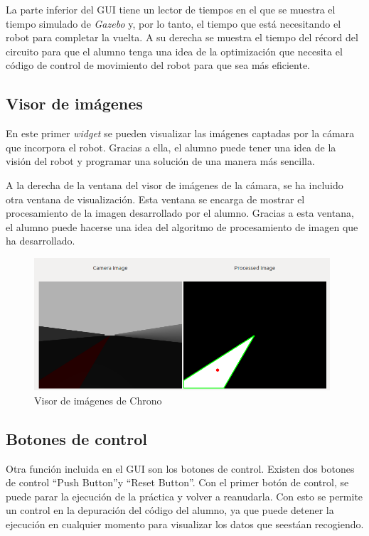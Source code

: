 La parte inferior del GUI tiene un lector de tiempos en el que se muestra el tiempo simulado de \textit{Gazebo} y, por lo tanto, el tiempo que está necesitando el robot para completar la vuelta. A su derecha se muestra el tiempo del récord del circuito para que el alumno tenga una idea de la optimización que necesita el código de control de movimiento del robot para que sea más eficiente.

\subsection{Visor de imágenes}
En este primer \textit{widget} se pueden visualizar las imágenes captadas por la cámara que incorpora el robot. Gracias a ella, el alumno puede tener una idea de la visión del robot y programar una solución de una manera más sencilla.

A la derecha de la ventana del visor de imágenes de la cámara, se ha incluido otra ventana de visualización. Esta ventana se encarga de mostrar el procesamiento de la imagen desarrollado por el alumno. Gracias a esta ventana, el alumno puede hacerse una idea del algoritmo de procesamiento de imagen que ha desarrollado.

\begin{figure}[H]
  \begin{center}
    \includegraphics[width=0.98\textwidth]{figures/visor_imagen_chrono.png}
		\caption{Visor de imágenes de Chrono}
		\label{fig.vich}
		\end{center}
\end{figure}

\subsection{Botones de control}
Otra función incluida en el GUI son los botones de control. Existen dos botones de control ``Push Button''y ``Reset Button''.
Con el primer botón de control, se puede parar la ejecución de la práctica y volver a reanudarla. Con esto se permite un control en la depuración del código del alumno, ya que puede detener la ejecución en cualquier momento para visualizar los datos que seestáan recogiendo.

